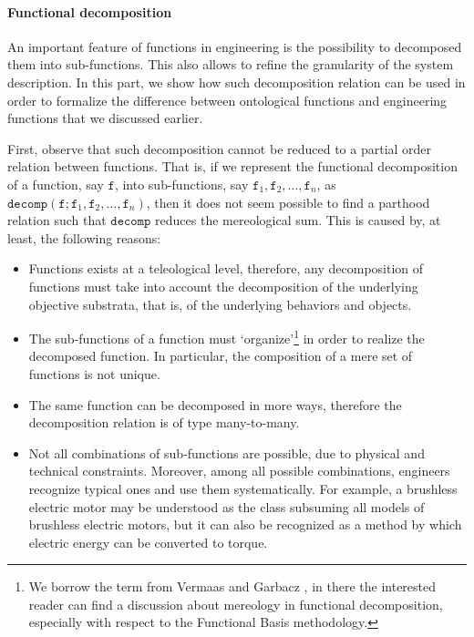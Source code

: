 \documentclass[sw]{iosart2x}
\newcommand{\generalStyle}[1]{\texttt{#1}}
\newcommand{\cst}[1]{\ensuremath{\mathtt{#1}}}
\newcommand{\decom}{\generalStyle{decomp}}
\newcommand{\TODO}[1]{{\color{red} #1}}
\begin{document}
\paragraph{Functional decomposition}
{   
An important feature of functions in engineering is the possibility to decomposed them into sub-functions. This also allows to refine the granularity of the system description. In this part, we show how such decomposition relation can be used in order to formalize the difference between ontological functions and engineering functions that we discussed earlier.

First, observe that such decomposition cannot be reduced to a partial order relation between functions. %
That is, if we represent the functional decomposition of a function, say $\cst{f}$, into sub-functions, say $\cst{f}_1, \cst{f}_2, \dots, \cst{f}_n$, as $\decom(\cst{f};\cst{f}_1,\cst{f}_2,\dots,\cst{f}_n)$, then it does not seem possible to find a parthood relation such that $\decom$ reduces the mereological sum.
This is caused by, at least, the following reasons:
\begin{itemize}
  \item Functions exists at a teleological level, therefore, any decomposition of functions must take into account the decomposition of the underlying objective substrata, that is, of the underlying behaviors and objects.
  \item The sub-functions of a function must `organize'\footnote{We borrow the term from Vermaas and Garbacz \cite{vermaasFunctionalDecompositionMereology2009a}, in there the interested reader can find a discussion about mereology in functional decomposition, especially with respect to the Functional Basis methodology.} in order to realize the decomposed function. In particular, the composition of a mere set of functions is not unique.
  \item The same function can be decomposed in more ways, therefore the decomposition relation is of type many-to-many.
  \item Not all combinations of sub-functions are possible, due to physical and technical constraints. 
  Moreover, among all possible combinations, engineers recognize typical ones and use them systematically. 
  For example, a brushless electric motor may be understood as the class subsuming all models of brushless electric motors, but it can also be recognized as a method by which electric energy can be converted to torque.

\end{itemize}}
\end{document}
